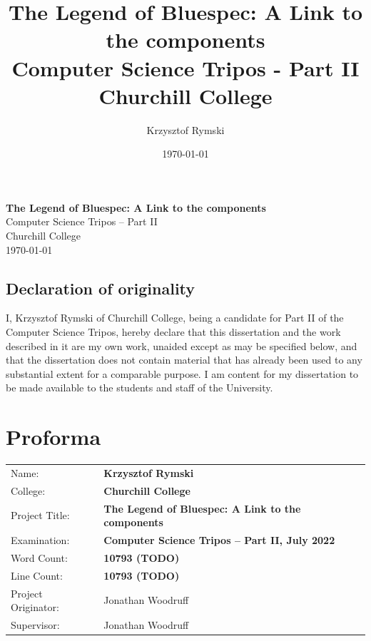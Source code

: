 \documentclass[12pt]{report}
\title{The Legend of Bluespec: A Link to the components \\
\large Computer Science Tripos - Part II \\
Churchill College}
\date{\today}
\author{Krzysztof Rymski}
\begin{document}


\pagestyle{empty}


\vspace*{60mm}
\begin{center}
\Huge
\textbf{The Legend of Bluespec: A Link to the components} \\[5mm]
Computer Science Tripos -- Part II \\[5mm]
Churchill College \\[5mm]
\today  %
\end{center}

\newpage
\section*{Declaration of originality}

I, Krzysztof Rymski of Churchill College, being a candidate for Part II of the Computer Science Tripos, hereby declare that this dissertation and the work described in it are my own work, unaided except as may be specified below, and that the dissertation does not contain material that has already been used to any substantial extent for a comparable purpose. I am content for my dissertation to be made available to the students and staff of the University.

\bigskip
{}

\medskip
{}


\newpage

\pagestyle{plain}

\chapter*{Proforma}

{\large
\begin{tabular}{ll}
Name:               & \bf Krzysztof Rymski                      \\
College:            & \bf Churchill College                     \\
Project Title:      & \bf The Legend of Bluespec: A Link to the components \\
Examination:        & \bf Computer Science Tripos -- Part II, July 2022  \\
Word Count:         & \bf 10793 (TODO)\footnotemark[1]  \\
Line Count:         & \bf 10793 (TODO)\footnotemark[1]  \\
Project Originator: & Jonathan Woodruff                   \\
Supervisor:         & Jonathan Woodruff                    \\ 
\end{tabular}
}
\end{document}
